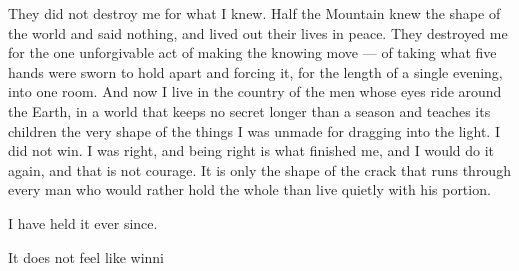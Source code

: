 They did not destroy me for what I knew. Half the Mountain knew the shape of the world and said nothing, and lived out their lives in peace. They destroyed me for the one unforgivable act of making the knowing move — of taking what five hands were sworn to hold apart and forcing it, for the length of a single evening, into one room. And now I live in the country of the men whose eyes ride around the Earth, in a world that keeps no secret longer than a season and teaches its children the very shape of the things I was unmade for dragging into the light. I did not win. I was right, and being right is what finished me, and I would do it again, and that is not courage. It is only the shape of the crack that runs through every man who would rather hold the whole than live quietly with his portion.\par

I have held it ever since.\par

It does not feel like winni